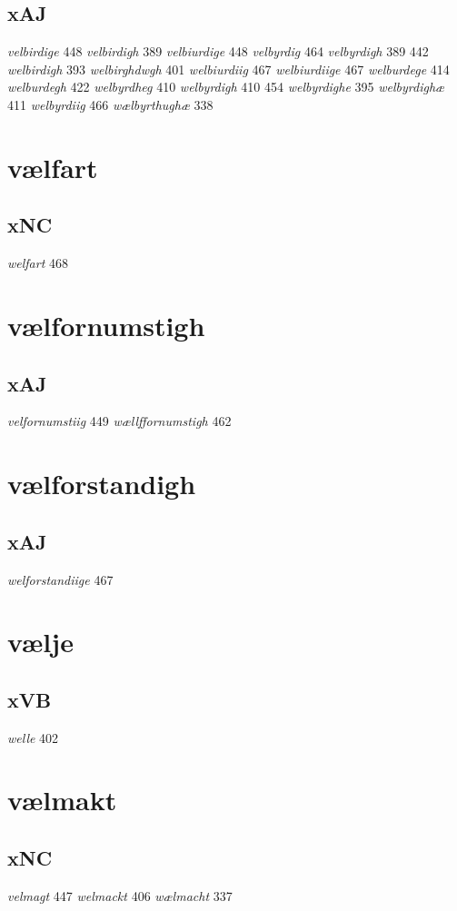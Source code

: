 \documentclass[a4paper,twocolumn]{article}
\begin{document}
\subsection{xAJ}
\label{sec:org27c3800}
\emph{velbirdige} 448 \emph{velbirdigh} 389 \emph{velbiurdige} 448 \emph{velbyrdig} 464 \emph{velbyrdigh} 389 442 \emph{welbirdigh} 393 \emph{welbirghdwgh} 401 \emph{welbiurdiig} 467 \emph{welbiurdiige} 467 \emph{welburdege} 414 \emph{welburdegh} 422 \emph{welbyrdheg} 410 \emph{welbyrdigh} 410 454 \emph{welbyrdighe} 395 \emph{welbyrdighæ} 411 \emph{welbyrdiig} 466 \emph{wælbyrthughæ} 338 
\section{vælfart}
\label{sec:org87883e2}
\subsection{xNC}
\label{sec:org50e866f}
\emph{welfart} 468 
\section{vælfornumstigh}
\label{sec:org0729f79}
\subsection{xAJ}
\label{sec:org9fdb919}
\emph{velfornumstiig} 449 \emph{wællffornumstigh} 462 
\section{vælforstandigh}
\label{sec:orgb0e198e}
\subsection{xAJ}
\label{sec:org60999de}
\emph{welforstandiige} 467 
\section{vælje}
\label{sec:orgc25d87f}
\subsection{xVB}
\label{sec:orgb22f568}
\emph{welle} 402 
\section{vælmakt}
\label{sec:orgf4ba545}
\subsection{xNC}
\label{sec:orge23af66}
\emph{velmagt} 447 \emph{welmackt} 406 \emph{wælmacht} 337 
\end{document}

